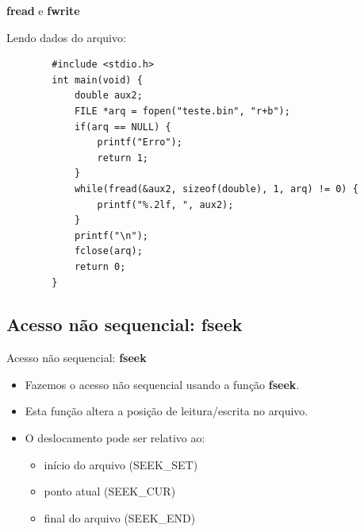 \documentclass[handout]{beamer}
\begin{document}
\begin{frame}[fragile]{\textbf{fread} e \textbf{fwrite}}

    Lendo dados do arquivo:
    \vspace{-1em}
    \begin{verbatim}
        #include <stdio.h>
        int main(void) {
            double aux2;
            FILE *arq = fopen("teste.bin", "r+b");
            if(arq == NULL) {
                printf("Erro");
                return 1;
            }
            while(fread(&aux2, sizeof(double), 1, arq) != 0) {
                printf("%.2lf, ", aux2);
            }
            printf("\n");
            fclose(arq);
            return 0;
        }
    \end{verbatim}

\end{frame}

\subsection{Acesso não sequencial: fseek}

\begin{frame}[fragile]{Acesso não sequencial: \textbf{fseek}}

    \begin{itemize}
        \item Fazemos o acesso não sequencial usando a função \textbf{fseek}.
        \item Esta função altera a posição de leitura/escrita no arquivo.
        \item O deslocamento pode ser relativo ao:
        \begin{itemize}
            \item início do arquivo (SEEK\_SET)
            \item ponto atual (SEEK\_CUR)
            \item final do arquivo (SEEK\_END)
        \end{itemize}
    \end{itemize}

\end{frame}
\end{document}
